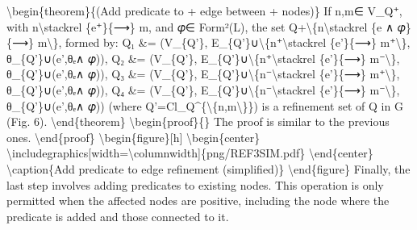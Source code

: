 \documentclass{article}%
\begin{document}
\newline%
\textbackslash{}begin\{theorem\}\{(Add predicate to + edge between + nodes)\}\newline%
If n,m∈ V\_Q⁺, with n\textbackslash{}stackrel \{e⁺\}\{⟶\} m, and 𝜑∈ Form²(L), the set Q+\textbackslash{}\{n\textbackslash{}stackrel \{e ∧ 𝜑\}\{⟶\} m\textbackslash{}\}, formed by:\newline%
\newline%
Q₁ \&= (V\_\{Q'\}, E\_\{Q'\}∪\textbackslash{}\{n⁺\textbackslash{}stackrel \{e'\}\{⟶\} m⁺\textbackslash{}\}, θ\_\{Q'\}∪(e',θₑ∧ 𝜑)),\newline%
\newline%
Q₂ \&= (V\_\{Q'\}, E\_\{Q'\}∪\textbackslash{}\{n⁺\textbackslash{}stackrel \{e'\}\{⟶\} m⁻\textbackslash{}\}, θ\_\{Q'\}∪(e',θₑ∧ 𝜑)),\newline%
\newline%
Q₃ \&= (V\_\{Q'\}, E\_\{Q'\}∪\textbackslash{}\{n⁻\textbackslash{}stackrel \{e'\}\{⟶\} m⁺\textbackslash{}\}, θ\_\{Q'\}∪(e',θₑ∧ 𝜑)),\newline%
\newline%
Q₄ \&= (V\_\{Q'\}, E\_\{Q'\}∪\textbackslash{}\{n⁻\textbackslash{}stackrel \{e'\}\{⟶\} m⁻\textbackslash{}\}, θ\_\{Q'\}∪(e',θₑ∧ 𝜑))\newline%
\newline%
(where Q'=Cl\_Q\^{}\{\textbackslash{}\{n,m\textbackslash{}\}\}) is a refinement set of Q in G (Fig. 6).\newline%
\textbackslash{}end\{theorem\}\newline%
\textbackslash{}begin\{proof\}\{\}\newline%
The proof is similar to the previous ones.\newline%
\textbackslash{}end\{proof\}\newline%
\newline%
\textbackslash{}begin\{figure\}{[}h{]}\newline%
\textbackslash{}begin\{center\}\newline%
\textbackslash{}includegraphics{[}width=\textbackslash{}columnwidth{]}\{png/REF3SIM.pdf\}\newline%
\textbackslash{}end\{center\}\newline%
\textbackslash{}caption\{Add predicate to edge refinement (simplified)\}\newline%
\textbackslash{}end\{figure\}\newline%
\newline%
Finally, the last step involves adding predicates to existing nodes. This operation is only permitted when the affected nodes are positive, including the node where the predicate is added and those connected to it.\newline%
\end{document}
